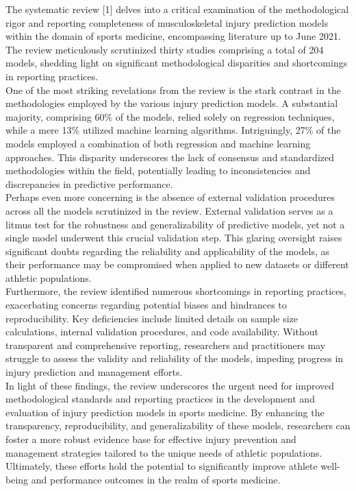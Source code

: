 \documentclass[12pt, English]{article}
\begin{document}
\begin{normalsize}
The systematic review [1] delves into a critical examination of the methodological rigor and reporting completeness of musculoskeletal injury prediction models within the domain of sports medicine, encompassing literature up to June 2021. The review meticulously scrutinized thirty studies comprising a total of 204 models, shedding light on significant methodological disparities and shortcomings in reporting practices.\\
One of the most striking revelations from the review is the stark contrast in the methodologies employed by the various injury prediction models. A substantial majority, comprising 60\% of the models, relied solely on regression techniques, while a mere 13\% utilized machine learning algorithms. Intriguingly, 27\% of the models employed a combination of both regression and machine learning approaches. This disparity underscores the lack of consensus and standardized methodologies within the field, potentially leading to inconsistencies and discrepancies in predictive performance.\\
Perhaps even more concerning is the absence of external validation procedures across all the models scrutinized in the review. External validation serves as a litmus test for the robustness and generalizability of predictive models, yet not a single model underwent this crucial validation step. This glaring oversight raises significant doubts regarding the reliability and applicability of the models, as their performance may be compromised when applied to new datasets or different athletic populations.\\
Furthermore, the review identified numerous shortcomings in reporting practices, exacerbating concerns regarding potential biases and hindrances to reproducibility. Key deficiencies include limited details on sample size calculations, internal validation procedures, and code availability. Without transparent and comprehensive reporting, researchers and practitioners may struggle to assess the validity and reliability of the models, impeding progress in injury prediction and management efforts.\\
In light of these findings, the review underscores the urgent need for improved methodological standards and reporting practices in the development and evaluation of injury prediction models in sports medicine. By enhancing the transparency, reproducibility, and generalizability of these models, researchers can foster a more robust evidence base for effective injury prevention and management strategies tailored to the unique needs of athletic populations. Ultimately, these efforts hold the potential to significantly improve athlete well-being and performance outcomes in the realm of sports medicine.


\end{normalsize}
\end{document}

